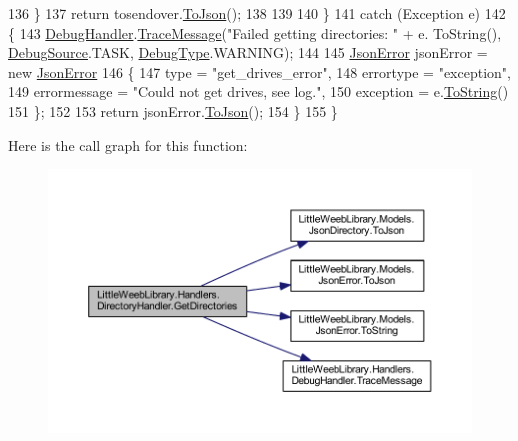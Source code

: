 \begin{DoxyCode}
136                 \}
137                 \textcolor{keywordflow}{return} tosendover.\mbox{\hyperlink{class_little_weeb_library_1_1_models_1_1_json_directories_a06826e97f8dd170ecad5574cf8ef816a}{ToJson}}();
138 
139 
140             \}
141             \textcolor{keywordflow}{catch} (Exception e)
142             \{
143                 \mbox{\hyperlink{class_little_weeb_library_1_1_handlers_1_1_directory_handler_adb882b8ec72046e2b95b6d11228f6927}{DebugHandler}}.\mbox{\hyperlink{interface_little_weeb_library_1_1_handlers_1_1_i_debug_handler_a2e405bc3492e683cd3702fae125221bc}{TraceMessage}}(\textcolor{stringliteral}{"Failed getting directories: "} + e.
      ToString(), \mbox{\hyperlink{namespace_little_weeb_library_1_1_handlers_a2a6ca0775121c9c503d58aa254d292be}{DebugSource}}.TASK, \mbox{\hyperlink{namespace_little_weeb_library_1_1_handlers_ab66019ed40462876ec4e61bb3ccb0a62}{DebugType}}.WARNING);
144 
145                 \mbox{\hyperlink{class_little_weeb_library_1_1_models_1_1_json_error}{JsonError}} jsonError = \textcolor{keyword}{new} \mbox{\hyperlink{class_little_weeb_library_1_1_models_1_1_json_error}{JsonError}}
146                 \{
147                     type = \textcolor{stringliteral}{"get\_drives\_error"},
148                     errortype = \textcolor{stringliteral}{"exception"},
149                     errormessage = \textcolor{stringliteral}{"Could not get drives, see log."},
150                     exception = e.\mbox{\hyperlink{class_little_weeb_library_1_1_models_1_1_json_error_ad7d5522c90119111d2e929f39e7f6d3c}{ToString}}()
151                 \};
152 
153                 \textcolor{keywordflow}{return} jsonError.\mbox{\hyperlink{class_little_weeb_library_1_1_models_1_1_json_error_a0e3e7dd2e2990404b7f0461742b23440}{ToJson}}();
154             \}
155         \}
\end{DoxyCode}
Here is the call graph for this function\+:\nopagebreak
\begin{figure}[H]
\begin{center}
\leavevmode
\includegraphics[width=350pt]{class_little_weeb_library_1_1_handlers_1_1_directory_handler_aa9d1414a83cadcf99da2cad30f39b2e3_cgraph}
\end{center}
\end{figure}
